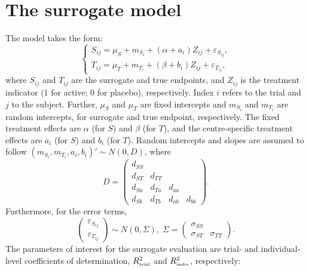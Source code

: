 \documentclass[11pt,a5paper,twoside]{book}
\begin{document}
{\section{The surrogate model}
The model takes the form:
\begin{equation}
\label{surrogatemodel}
\left\{
\begin{array}{l}
S_{ij}=\mu_S + m_{S_i} + (\alpha + a_i) Z_{ij} + \varepsilon_{S_{ij}},\\
T_{ij}= \mu_T + m_{T_i} + (\beta + b_i) Z_{ij} + \varepsilon_{T_{ij}},
\end{array} \right.
\end{equation}
where $S_{ij}$ and $T_{ij}$ are the surrogate and true endpoints, and $Z_{ij}$ is the treatment indicator (1 for active; 0 for placebo), respectively. Index $i$ refers to the trial and $j$ to the subject. Further, $\mu_{S}$ and $\mu_{T}$ are fixed intercepts and $m_{S_i}$ and $m_{T_i}$ are  random intercepts, for surrogate and true endpoint, respectively. The fixed treatment effects are $\alpha$ (for $S$) and $\beta$ (for $T$), and the centre-specific treatment effects are $a_i$ (for $S$) and $b_i$ (for $T$). 
Random intercepts and slopes are assumed to follow
$(m_{S_i}, m_{T_i}, a_i, b_i)'\sim N(0,D)$,
where 
\begin{equation}
\label{D}
D = \left(
\begin{array}{cccc}
d_{SS} & & &\\
d_{ST} & d_{TT} & &\\
d_{Sa} & d_{Ta} & d_{aa} &\\
d_{Sb} & d_{Tb} & d_{ab} & d_{bb}
\end{array} \right).
\end{equation}
Furthermore, for the error terms,
\begin{equation}
\label{surrogateSigma}
\left(\begin{array}{c}
\varepsilon_{S_{ij}}\\
\varepsilon_{T_{ij}}
\end{array} \right)
\sim N(0,\Sigma),\; \Sigma = \left(
\begin{array}{cc}
\sigma_{SS} & \\
\sigma_{ST} & \sigma_{TT}
\end{array} \right).
\end{equation}
The parameters of interest for the surrogate evaluation are trial- and individual-level coefficients of determination, $R^2_{\mbox{\tiny trial}}$ and $R^2_{\mbox{\tiny indiv}}$, respectively:
\begin{equation}

\end{equation}}
\end{document}
